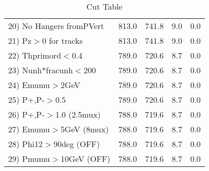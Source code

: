 \begin{table}[h!]
\begin{tabular}{||l||r|r|r|r||}
 20) No Hangers fromPVert &       813.0 &       741.8 &         9.0 &         0.0 \\
 21) Pz$>$0 for tracks    &       813.0 &       741.8 &         9.0 &         0.0 \\
 22) Thprimord$<$0.4      &       789.0 &       720.6 &         8.7 &         0.0 \\
 23) Nunh*fracunh$<$200   &       789.0 &       720.6 &         8.7 &         0.0 \\
 24) Emumu$>$2GeV         &       789.0 &       720.6 &         8.7 &         0.0 \\
 25) P+,P-$>$0.5          &       789.0 &       720.6 &         8.7 &         0.0 \\
 26) P+,P-$>$1.0 (2.5mux) &       788.0 &       719.6 &         8.7 &         0.0 \\
 27) Emumu$>$5GeV  (8mux) &       788.0 &       719.6 &         8.7 &         0.0 \\
 28) Phi12$>$90deg  (OFF) &       788.0 &       719.6 &         8.7 &         0.0 \\
 29) Pmumu$>$10GeV  (OFF) &       788.0 &       719.6 &         8.7 &         0.0 \\
 \hline
 \hline
 \end{tabular}
 \caption{Cut Table \cohpip }
 \label{tab-cut_copip}
 \end{table}
